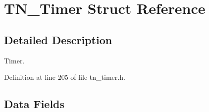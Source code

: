 \hypertarget{structTN__Timer}{\section{T\+N\+\_\+\+Timer Struct Reference}
\label{structTN__Timer}
}


\subsection{Detailed Description}
Timer. 

Definition at line 205 of file tn\+\_\+timer.\+h.

\subsection*{Data Fields}
